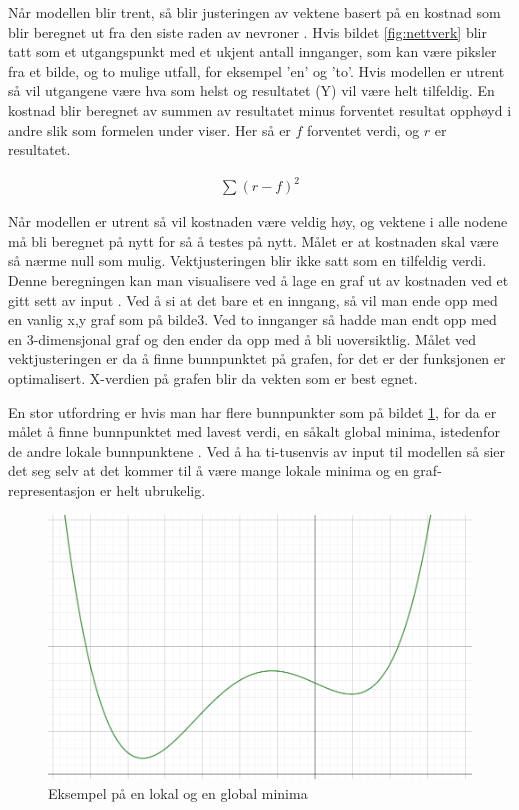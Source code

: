 Når modellen blir trent, så blir justeringen av vektene basert på en kostnad som blir beregnet ut fra den siste raden av nevroner \cite{neural_net}. Hvis bildet \ref{fig:nettverk} blir tatt som et utgangspunkt med et ukjent antall innganger, som kan være piksler fra et bilde, og to mulige utfall, for eksempel ’en’ og ’to’. Hvis modellen er utrent så vil utgangene være hva som helst og resultatet (Y) vil være helt tilfeldig. En kostnad  blir beregnet av summen av resultatet minus forventet resultat opphøyd i andre slik som formelen under viser. Her så er $f$ forventet verdi, og $r$ er resultatet.

\begin{align}
	\sum{(r-f)^2}
\end{align}

Når modellen er utrent så vil kostnaden være veldig høy, og vektene i alle nodene må bli beregnet på nytt for så å testes på nytt. Målet er at kostnaden skal være så nærme null som mulig.\newline
Vektjusteringen blir ikke satt som en tilfeldig verdi. Denne beregningen kan man visualisere ved å lage en graf ut av kostnaden ved et gitt sett av input \cite{neural_net}. Ved å si at det bare et en inngang, så vil man ende opp med en vanlig x,y graf som på bilde3. Ved to innganger så hadde man endt opp med en 3-dimensjonal graf og den ender da opp med å bli uoversiktlig. Målet ved vektjusteringen er da å finne bunnpunktet på grafen, for det er der funksjonen er optimalisert. X-verdien på grafen blir da vekten som er best egnet.

En stor utfordring er hvis man har flere bunnpunkter som på bildet \ref{fig:kostnad}, for da er målet å finne bunnpunktet med lavest verdi, en såkalt global minima, istedenfor de andre lokale bunnpunktene \cite{neural_net}. Ved å ha ti-tusenvis av input til modellen så sier det seg selv at det kommer til å være mange lokale minima og en graf-representasjon er helt ubrukelig.

\begin{figure}[ht]
    \centering
    \includegraphics[width=\textwidth]{images/cost_calc.png}
    \caption{Eksempel på en lokal og en global minima}
    \label{fig:kostnad}
\end{figure}


